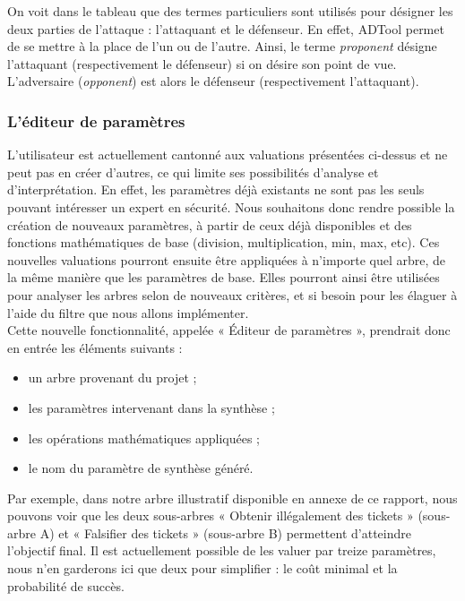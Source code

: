 On voit dans le tableau que des termes particuliers sont utilisés pour désigner les deux parties de l'attaque : l'attaquant et le défenseur. En effet, ADTool permet de se mettre à la place de l'un ou de l'autre. Ainsi, le terme \textit{proponent} désigne l'attaquant (respectivement le défenseur) si on désire son point de vue. L'adversaire (\textit{opponent}) est alors le défenseur (respectivement l'attaquant). %

\subsubsection{L'éditeur de paramètres}

L'utilisateur est actuellement cantonné aux valuations présentées ci-dessus et ne peut pas en créer d'autres, ce qui limite ses possibilités d'analyse et d'interprétation. En effet, les paramètres déjà existants ne sont pas les seuls pouvant intéresser un expert en sécurité. Nous souhaitons donc rendre possible la création de nouveaux paramètres, à partir de ceux déjà disponibles et des fonctions mathématiques de base (division, multiplication, min, max, etc). Ces nouvelles valuations pourront ensuite être appliquées à n'importe quel arbre, de la même manière que les paramètres de base. Elles pourront ainsi être utilisées pour analyser les arbres selon de nouveaux critères, et si besoin pour les élaguer à l'aide du filtre que nous allons implémenter.\\

Cette nouvelle fonctionnalité, appelée « Éditeur de paramètres », prendrait donc en entrée les éléments suivants :
\begin{itemize}[label=,font=\color{magenta},parsep=0cm,itemsep=0cm]
\item un arbre provenant du projet ;
\item les paramètres intervenant dans la synthèse ;
\item les opérations mathématiques appliquées ;
\item le nom du paramètre de synthèse généré.
\end{itemize}

Par exemple, dans notre arbre illustratif disponible en annexe de ce rapport, nous pouvons voir que les deux sous-arbres « Obtenir illégalement des tickets » (sous-arbre A) et « Falsifier des tickets » (sous-arbre B) permettent d'atteindre l'objectif final. Il est actuellement possible de les valuer par treize paramètres, nous n'en garderons ici que deux pour simplifier : le coût minimal et la probabilité de succès.\\

